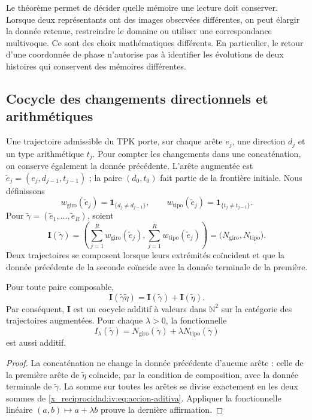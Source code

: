 Le théorème permet de décider quelle mémoire une
lecture doit conserver. Lorsque deux représentants ont des images observées
différentes, on peut élargir la donnée retenue, restreindre
le domaine ou utiliser une correspondance multivoque.
Ce sont des choix mathématiques différents. En particulier, le
retour d’une coordonnée de phase n’autorise pas à identifier
les évolutions de deux histoires qui conservent des mémoires
différentes.

\subsection{Cocycle des changements directionnels et arithmétiques}

Une trajectoire admissible du TPK porte, sur chaque arête
\(e_j\), une direction \(d_j\) et un type arithmétique
\(t_j\). Pour compter les changements dans une concaténation,
on conserve également la donnée précédente. L’arête augmentée est
\(\widetilde e_j=(e_j,d_{j-1},t_{j-1})\) ; la paire
\((d_0,t_0)\) fait partie de la frontière initiale. Nous définissons
\[
 w_{\mathrm{giro}}(\widetilde e_j)
       =\mathbf1_{\{d_j\ne d_{j-1}\}},\qquad
 w_{\mathrm{tipo}}(\widetilde e_j)
       =\mathbf1_{\{t_j\ne t_{j-1}\}}.
\]
Pour \(\widetilde\gamma=(\widetilde e_1,\ldots,
\widetilde e_R)\), soient
\begin{equation}
 \mathbf I(\widetilde\gamma)=
 \left(\sum_{j=1}^R w_{\mathrm{giro}}(\widetilde e_j),
       \sum_{j=1}^R w_{\mathrm{tipo}}(\widetilde e_j)\right)
 =\bigl(N_{\mathrm{giro}},N_{\mathrm{tipo}}\bigr).
 \label{x_reciprocidad:iv:eq:cociclo-accion}
\end{equation}
Deux trajectoires se composent lorsque leurs extrémités coïncident
et que la donnée précédente de la seconde coïncide avec la donnée
terminale de la première.

\begin{proposition}
\label{x_reciprocidad:iv:prop:accion-aditiva}
Pour toute paire composable,
\begin{equation}
 \mathbf I(\widetilde\gamma\widetilde\eta)
 =\mathbf I(\widetilde\gamma)+\mathbf I(\widetilde\eta).
 \label{x_reciprocidad:iv:eq:accion-aditiva}
\end{equation}
Par conséquent, \(\mathbf I\) est un cocycle additif à valeurs
dans \(\mathbb N^2\) sur la catégorie des trajectoires
augmentées. Pour chaque \(\lambda>0\), la fonctionnelle
\[
 I_\lambda(\widetilde\gamma)
 =N_{\mathrm{giro}}(\widetilde\gamma)
      +\lambda N_{\mathrm{tipo}}(\widetilde\gamma)
\]
est aussi additif.
\end{proposition}
\begin{proof}
La concaténation ne change la donnée précédente d’aucune
arête : celle de la première arête de \(\widetilde\eta\)
coïncide, par la condition de composition, avec la donnée terminale
de \(\widetilde\gamma\). La somme sur toutes les arêtes
se divise exactement en les deux sommes de
\eqref{x_reciprocidad:iv:eq:accion-aditiva}. Appliquer la fonctionnelle linéaire
\((a,b)\mapsto a+\lambda b\) prouve la dernière affirmation.
\end{proof}

